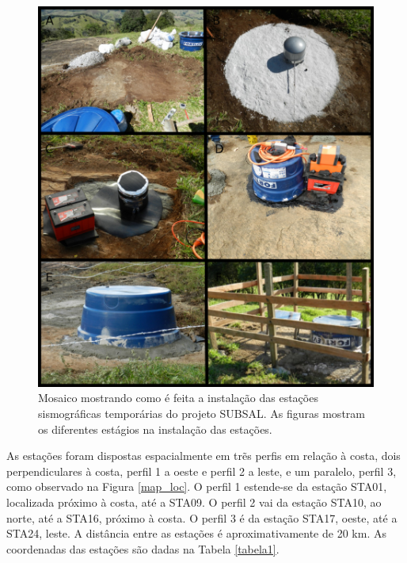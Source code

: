 \begin{figure}[!ht]
\centering
\includegraphics[scale=0.5]{instalacao.png}
\caption{Mosaico mostrando como é feita a instalação das estações sismográficas temporárias do projeto SUBSAL. As figuras mostram os diferentes estágios na instalação das estações.}
\label{instalacao}
\end{figure} 

As estações foram dispostas espacialmente em trẽs perfis em relação à costa, dois perpendiculares à costa, perfil 1 a oeste e perfil 2 a leste, e um paralelo, perfil 3, como observado na Figura \ref{map_loc}. O perfil 1 estende-se da estação STA01, localizada próximo à costa, até a STA09. O perfil 2 vai da estação STA10, ao norte, até a STA16, próximo à costa. O perfil 3 é da estação STA17, oeste, até a STA24, leste. A distância entre as estações é aproximativamente de 20 km. As coordenadas das estações são dadas na Tabela \ref{tabela1}. 

